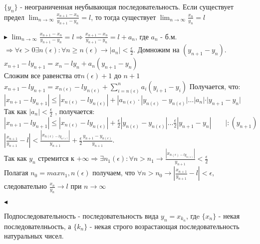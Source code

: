 \documentclass[14pt]{extreport}
\begin{document}
            \begin{theorem}
                $\{y_n\} $ - неограниченная неубывающая последовательность. Если существует предел $\lim_{n\rightarrow\infty} \frac{x_{n+1} - x_n}{y_{n+1} - y_n} = l$, то тогда существует $\lim_{n\rightarrow\infty} \frac{x_n}{y_n} = l$
            \end{theorem}
            $\blacktriangleright$ 
                $\lim_{n\rightarrow \infty } \frac{x_{n+1}-x_n}{y_{n+1}-y_n} = l \Rightarrow \frac{x_{n+1}-x_n}{y_{n+1}-y_n} = l + a_n$, где $a_n$ - б.м. $\Rightarrow \forall \epsilon > 0 \exists n(\epsilon) : \forall n \geq n(\epsilon) \rightarrow |a_n| < \frac{\epsilon}{2}$. Домножим на $(y_{n+1} - y_n)$. \\ $x_{n+1} - ly_{n+1} = x_n - ly_n + a_n (y_{n+1} - y_n)$
                \\ Сложим все равенства от$n(\epsilon)+1$ до $n+1$\\ 
                $x_{n+1} - ly_{n+1} = x_{n(\epsilon)} - ly_{n(\epsilon)}+ \sum_{i=n(\epsilon)}^n a_i (y_{i+1} - y_i)$
                Получается, что: \\ 
                $|x_{n+1} - ly_{n+1}| \leq |x_{n(\epsilon)} - ly_{n(\epsilon)}|+|a_{n(\epsilon)} \cdot |y_{n(\epsilon)} - y_{n(\epsilon)}| \dots |a_n|\cdot |y_{n+1} - y_n|$ \\
                Так как $|a_n| < \frac{\epsilon}{2}$ , получается: \\ 
                $|x_{n+1} - ly_{n+1}| \leq |x_{n(\epsilon)} - ly_{n(\epsilon)}|+\frac{\epsilon}{2} |y_{n(\epsilon)} - y_{n(\epsilon)}| \dots\frac{\epsilon}{2} |y_{n+1} - y_n| \qquad | : (y_{n+1})$  \\ 
                $|\frac{x_{n+1}}{y_{n+1}} - l| < \frac{|x_{n(\epsilon) - ly_{n(\epsilon)}}|}{y_{n+1}} + \frac{\epsilon}{2} \frac{y_{n+1} - y_{n(\epsilon)}}{y_{n+1}}$. \\ 
                Так как ${y_n}$ стремится к $+\infty \Rightarrow \exists n_1(\epsilon):\forall n > n_1 \rightarrow \frac{|x_{n(\epsilon) - ly_{n(\epsilon)}}|}{y_{n+1}} < \frac{\epsilon}{2}$ \\ 
                Полагая $n_0 = max{n_1, n(\epsilon)}$ получаем, что $\forall n > n_0 \rightarrow |\frac{x_{n+1}}{y_{n+1} } - l| < \epsilon$, следовательно $\frac{x_n}{y_n} \rightarrow l$ при $n\rightarrow\infty$

            $\blacktriangleleft$


            \begin{definition}
                Подпоследовательность - последовательность вида $y_n = x_{k_n}$, гдe $\{x_n\}$ - некая последователньость, а $\{k_n\} $ - некая строго возрастающая последовательность натуральных чисел.
            \end{definition}
\end{document}
